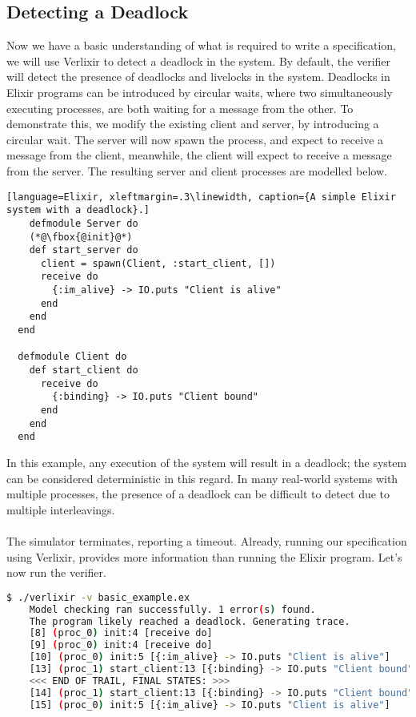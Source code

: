 \subsection{Detecting a Deadlock} \label{sec:deadlock}
Now we have a basic understanding of what is required to write a specification, we will use Verlixir to detect a deadlock in the system. By default, the verifier will detect the presence of deadlocks and livelocks in the system. Deadlocks in Elixir programs can be introduced by circular waits, where two simultaneously executing processes, are both waiting for a message from the other. To demonstrate this, we modify the existing client and server, by introducing a circular wait. The server will now spawn the process, and expect to receive a message from the client, meanwhile, the client will expect to receive a message from the server. The resulting server and client processes are modelled below.
\begin{lstlisting}[language=Elixir, xleftmargin=.3\linewidth, caption={A simple Elixir system with a deadlock}.]
    defmodule Server do
    (*@\fbox{@init}@*)
    def start_server do
      client = spawn(Client, :start_client, [])
      receive do
        {:im_alive} -> IO.puts "Client is alive"
      end
    end
  end
  
  defmodule Client do
    def start_client do
      receive do
        {:binding} -> IO.puts "Client bound"
      end
    end
  end  
\end{lstlisting}
In this example, any execution of the system will result in a deadlock; the system can be considered deterministic in this regard. In many real-world systems with multiple processes, the presence of a deadlock can be difficult to detect due to multiple interleavings.
\\ \\
The simulator terminates, reporting a timeout. Already, running our specification using Verlixir, provides more information than running the Elixir program. Let's now run the verifier.
\begin{lstlisting}[language=bash, xleftmargin=.2\linewidth]
    $ ./verlixir -v basic_example.ex
    Model checking ran successfully. 1 error(s) found.
    The program likely reached a deadlock. Generating trace.
    [8] (proc_0) init:4 [receive do]
    [9] (proc_0) init:4 [receive do]
    [10] (proc_0) init:5 [{:im_alive} -> IO.puts "Client is alive"]
    [13] (proc_1) start_client:13 [{:binding} -> IO.puts "Client bound"]
    <<< END OF TRAIL, FINAL STATES: >>>
    [14] (proc_1) start_client:13 [{:binding} -> IO.puts "Client bound"]
    [15] (proc_0) init:5 [{:im_alive} -> IO.puts "Client is alive"]
\end{lstlisting}
